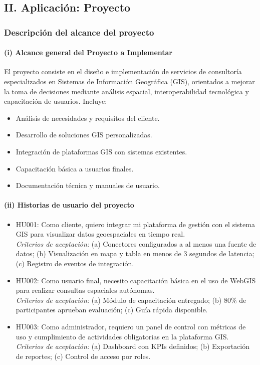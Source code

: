 \subsection{II. Aplicación: Proyecto}

\subsubsection{Descripción del alcance del proyecto}

\paragraph{(i) Alcance general del Proyecto a Implementar}
El proyecto consiste en el diseño e implementación de servicios de consultoría especializados en Sistemas de Información Geográfica (GIS), orientados a mejorar la toma de decisiones mediante análisis espacial, interoperabilidad tecnológica y capacitación de usuarios. Incluye:
\begin{itemize}
  \item Análisis de necesidades y requisitos del cliente.
  \item Desarrollo de soluciones GIS personalizadas.
  \item Integración de plataformas GIS con sistemas existentes.
  \item Capacitación básica a usuarios finales.
  \item Documentación técnica y manuales de usuario.
\end{itemize}

\paragraph{(ii) Historias de usuario del proyecto}
\begin{itemize}
  \item HU001: Como cliente, quiero integrar mi plataforma de gestión con el sistema GIS para visualizar datos geoespaciales en tiempo real. \\
  \textit{Criterios de aceptación:} (a) Conectores configurados a al menos una fuente de datos; (b) Visualización en mapa y tabla en menos de 3 segundos de latencia; (c) Registro de eventos de integración.
  \item HU002: Como usuario final, necesito capacitación básica en el uso de WebGIS para realizar consultas espaciales autónomas. \\
  \textit{Criterios de aceptación:} (a) Módulo de capacitación entregado; (b) 80\% de participantes aprueban evaluación; (c) Guía rápida disponible.
  \item HU003: Como administrador, requiero un panel de control con métricas de uso y cumplimiento de actividades obligatorias en la plataforma GIS. \\
  \textit{Criterios de aceptación:} (a) Dashboard con KPIs definidos; (b) Exportación de reportes; (c) Control de acceso por roles.
\end{itemize}

